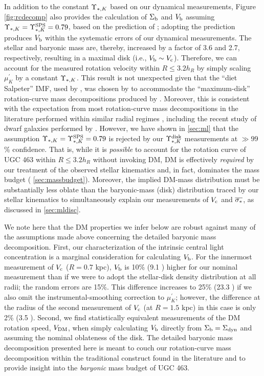 \documentclass[apj,iop,numberedappendix]{emulateapj}
\begin{document}
In addition to the constant $\Upsilon_{\ast,K}$ based on our dynamical measurements, Figure
\ref{fig:rcdecomp} also provides the calculation of $\Sigma_{\rm b}$ and $V_{\rm b}$
assuming $\Upsilon_{\ast,K} = \Upsilon_{\ast,K}^{\rm SPS} = 0.79$, based on the prediction of
; adopting the 
prediction produces $V_{\rm b}$ within the systematic errors of our dynamical
measurements.  The stellar and baryonic mass are, thereby, increased by a factor
of 3.6 and 2.7, respectively, resulting in a maximal disk (i.e., $V_{\rm b} \sim
V_{\rm c}$).  Therefore, we can account for the measured rotation velocity within
$R\leq 3.2 h_R$ by simply scaling $\mu^{\prime}_K$ by a constant $\Upsilon_{\ast,K}$.  This
result is not unexpected given that the ``diet Salpeter'' IMF, used by
, was chosen by \citet{2001ApJ...550..212B} to
accommodate the ``maximum-disk'' rotation-curve mass decompositions produced by
\citet{1997PhDT........13V}.  Moreover, this is consistent with the expectation
from most rotation-curve mass decompositions in the literature performed within
similar radial regimes \citep[see discussion by][]{2004IAUS..220..233S},
including the recent study of dwarf galaxies performed by
\citet{2011ApJ...729..118S}.  However, we have shown in \sect \ref{sec:ml} that
the assumption $\Upsilon_{\ast,K} = \Upsilon_{\ast,K}^{\rm SPS} = 0.79$ is rejected by our $\Upsilon_{\ast,K}^{\rm disk}$
measurements at $\gg99$\% confidence.  That is, while it is {\it possible} to
account for the rotation curve of UGC 463 within $R\leq 3.2 h_R$ without
invoking DM, DM is effectively {\it required} by our treatment of the observed
stellar kinematics and, in fact, dominates the mass budget (\sect
\ref{sec:massbudget}).  Moreover, the implied DM-mass distribution must be
substantially less oblate than the baryonic-mass (disk) distribution traced by
our stellar kinematics to simultaneously explain our measurements of $V_{\rm c}$ and
$\overline{\sigma_{\ast}}$, as discussed in \sect \ref{sec:mldisc}.

We note here that the DM properties we infer below are robust against many of
the assumptions made above concerning the detailed baryonic mass decomposition.
First, our characterization of the intrinsic central light concentration is a
marginal consideration for calculating $V_{\rm b}$.  For the innermost measurement
of $V_{\rm c}$ ($R = 0.7$ kpc), $V_{\rm b}$ is 10\% (9.1 \kms) higher for our nominal
measurement than if we were to adopt the stellar-disk density distribution at
all radii; the random errors are 15\%.  This difference increases to 25\% (23.3
\kms) if we also omit the instrumental-smoothing correction to $\mu^{\prime}_K$;
however, the difference at the radius of the second measurement of $V_{\rm c}$ (at $R
= 1.5$ kpc) in this case is only 2\% (3.5 \kms).  Second, we find statistically
equivalent measurements of the DM rotation speed, $V_{\rm DM}$, when simply
calculating $V_{\rm b}$ directly from $\Sigma_{\rm b} = \Sigma_{\rm dyn}$ and assuming the nominal
oblateness of the disk.  The detailed baryonic mass decomposition presented here
is meant to couch our rotation-curve mass decomposition within the traditional
construct found in the literature and to provide insight into the {\it baryonic}
mass budget of UGC 463.
\end{document}
